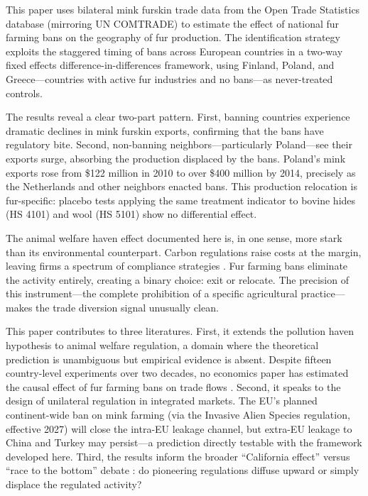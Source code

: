 \documentclass[12pt]{article}
\begin{document}
This paper uses bilateral mink furskin trade data from the Open Trade Statistics database (mirroring UN COMTRADE) to estimate the effect of national fur farming bans on the geography of fur production. The identification strategy exploits the staggered timing of bans across European countries in a two-way fixed effects difference-in-differences framework, using Finland, Poland, and Greece---countries with active fur industries and no bans---as never-treated controls.

The results reveal a clear two-part pattern. First, banning countries experience dramatic declines in mink furskin exports, confirming that the bans have regulatory bite. Second, non-banning neighbors---particularly Poland---see their exports surge, absorbing the production displaced by the bans. Poland's mink exports rose from \$122 million in 2010 to over \$400 million by 2014, precisely as the Netherlands and other neighbors enacted bans. This production relocation is fur-specific: placebo tests applying the same treatment indicator to bovine hides (HS 4101) and wool (HS 5101) show no differential effect.

The animal welfare haven effect documented here is, in one sense, more stark than its environmental counterpart. Carbon regulations raise costs at the margin, leaving firms a spectrum of compliance strategies \citep{greenstone2012impacts}. Fur farming bans eliminate the activity entirely, creating a binary choice: exit or relocate. The precision of this instrument---the complete prohibition of a specific agricultural practice---makes the trade diversion signal unusually clean.

This paper contributes to three literatures. First, it extends the pollution haven hypothesis to animal welfare regulation, a domain where the theoretical prediction is unambiguous but empirical evidence is absent. Despite fifteen country-level experiments over two decades, no economics paper has estimated the causal effect of fur farming bans on trade flows \citep{copeland2004trade}. Second, it speaks to the design of unilateral regulation in integrated markets. The EU's planned continent-wide ban on mink farming (via the Invasive Alien Species regulation, effective 2027) will close the intra-EU leakage channel, but extra-EU leakage to China and Turkey may persist---a prediction directly testable with the framework developed here. Third, the results inform the broader ``California effect'' versus ``race to the bottom'' debate \citep{vogel1995trading, drezner2001globalization}: do pioneering regulations diffuse upward or simply displace the regulated activity?
\end{document}
